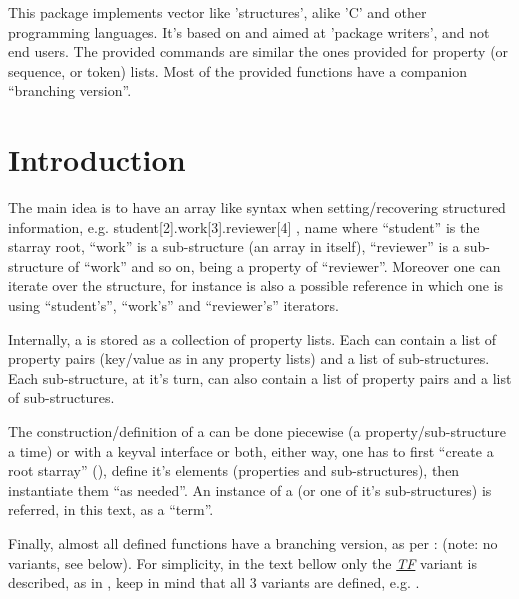 \documentclass[10pt]{article}
\begin{document}
  
\begin{typesetabstract}

This package implements vector like 'structures', alike 'C' and other programming languages. 
It's based on \cite{expl3} and aimed at 'package writers', and not end users. The provided commands are similar the ones provided for property (or sequence, or token) lists. Most of the provided functions have a companion ``branching version''.

\end{typesetabstract}

\tableofcontents

\section{Introduction}
The main idea is to have an array like syntax when setting/recovering structured information, e.g.  {student[2].work[3].reviewer[4] , name} where ``student'' is the starray root, ``work'' is a sub-structure (an array in itself), ``reviewer'' is a sub-structure of ``work'' and so on,  being a property of ``reviewer''. Moreover one can iterate over the structure, for instance  is also a possible reference in which one is using ``student's'', ``work's'' and ``reviewer's'' iterators.

Internally, a  is stored as a collection of property lists. Each  can contain a list of property pairs (key/value as in any \cite{expl3} property lists) and a list of sub-structures. Each sub-structure, at it's turn, can also contain a list of property pairs and a list of sub-structures. 

The construction/definition of a  can be done piecewise (a property/sub-structure a time) or with a keyval interface or both, either way, one has to first ``create a root starray'' (), define it's elements (properties and sub-structures), then instantiate them ``as needed''. An instance of a  (or one of it's sub-structures) is referred, in this text, as a ``term''.

Finally, almost all defined functions have a branching version, as per \cite{expl3}:  (note: no  variants, see below). For simplicity, in the text bellow only the \underline{\textsl{TF}} variant is described, as in , keep in mind that all 3 variants are defined, e.g. .
\end{document}
